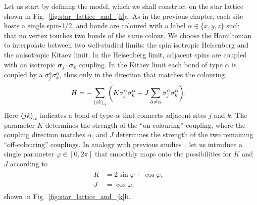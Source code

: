 Let us start by defining the model, which we shall construct on the star lattice shown in Fig.~\ref{fig:star_lattice_and_jk}a. As in the previous chapter, each site hosts a single spin-1/2, and bonds are coloured with a label $\alpha \in \{x,y,z\}$ such that no vertex touches two bonds of the same colour. We choose the Hamiltonian to interpolate between two well-studied limits: the spin isotropic Heisenberg and the anisotropic Kitaev limit. In the Heisenberg limit, adjacent spins are coupled with an isotropic $\mathbf{\sigma}_j \cdot \mathbf{\sigma}_k$ coupling. In the Kitaev limit each bond of type $\alpha$ is coupled by a $\sigma_j^\alpha \sigma_k^\alpha$, thus only in the direction that matches the colouring.
\begin{align} \label{eqn:kitave_heisenberg_hamiltonian}
    H = -
    \sum_{\braket{jk}_\alpha } \bigg (K \sigma_j^\alpha \sigma_k^\alpha
    +J \sum_{\bar \alpha \neq \alpha}  \sigma_j^{\bar \alpha} \sigma_k^{\bar \alpha}
    \bigg ).
\end{align}
Here $\braket{jk}_\alpha$ indicates a bond of type $\alpha$ that connects adjacent sites $j$ and $k$. The parameter $K$ determines the strength of the ``on-colouring'' coupling, where the coupling direction matches $\alpha$, and $J$ determines the strength of the two remaining ``off-colouring'' couplings. In analogy with previous studies~\cite{chaloupka_zigzag_2013, gohlke_dynamics_2017}, let us introduce a single parameter $\varphi \in [0,2\pi]$ that smoothly maps onto the possibilities for $K$ and $J$ according to
\begin{align} \begin{aligned} \label{eqn:phi_def}
    K &= 2\sin \varphi + \cos \varphi, \\
    J &= \cos \varphi,
\end{aligned}\end{align}
shown in Fig.~\ref{fig:star_lattice_and_jk}b. 